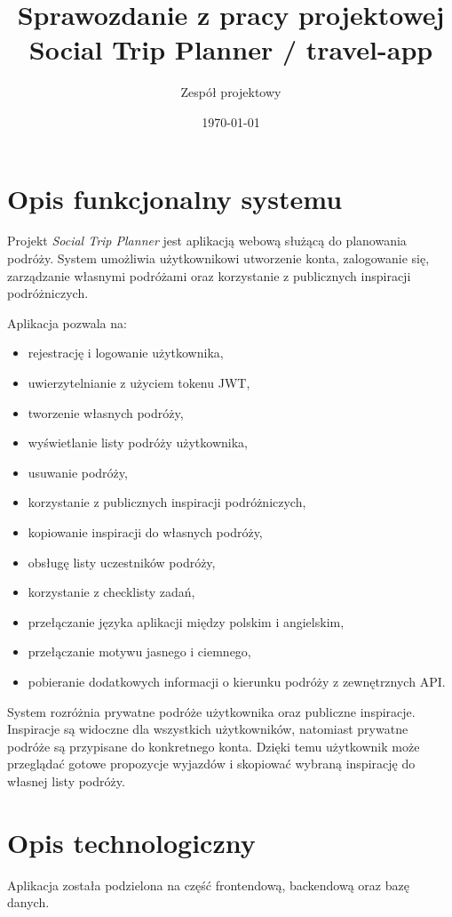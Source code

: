 \documentclass[12pt,a4paper]{article}
\title{Sprawozdanie z pracy projektowej\\\large Social Trip Planner / travel-app}
\author{Zespół projektowy}
\date{\today}
\begin{document}
\maketitle
\tableofcontents
\newpage

\section{Opis funkcjonalny systemu}

Projekt \textit{Social Trip Planner} jest aplikacją webową służącą do planowania podróży. System umożliwia użytkownikowi utworzenie konta, zalogowanie się, zarządzanie własnymi podróżami oraz korzystanie z publicznych inspiracji podróżniczych.

Aplikacja pozwala na:
\begin{itemize}
\item rejestrację i logowanie użytkownika,
\item uwierzytelnianie z użyciem tokenu JWT,
\item tworzenie własnych podróży,
\item wyświetlanie listy podróży użytkownika,
\item usuwanie podróży,
\item korzystanie z publicznych inspiracji podróżniczych,
\item kopiowanie inspiracji do własnych podróży,
\item obsługę listy uczestników podróży,
\item korzystanie z checklisty zadań,
\item przełączanie języka aplikacji między polskim i angielskim,
\item przełączanie motywu jasnego i ciemnego,
\item pobieranie dodatkowych informacji o kierunku podróży z zewnętrznych API.
\end{itemize}

System rozróżnia prywatne podróże użytkownika oraz publiczne inspiracje. Inspiracje są widoczne dla wszystkich użytkowników, natomiast prywatne podróże są przypisane do konkretnego konta. Dzięki temu użytkownik może przeglądać gotowe propozycje wyjazdów i skopiować wybraną inspirację do własnej listy podróży.

\section{Opis technologiczny}

Aplikacja została podzielona na część frontendową, backendową oraz bazę danych.
\end{document}
